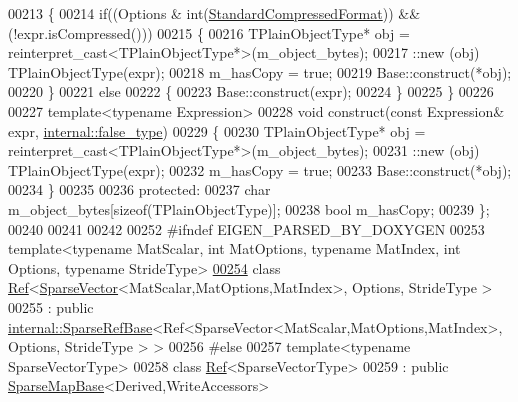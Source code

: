 \begin{DoxyCode}
00213     \{
00214       \textcolor{keywordflow}{if}((Options & \textcolor{keywordtype}{int}(\hyperlink{namespace_eigen_a668ffb0fb66c55c1c98bd35c52df648eaf81fc519ed9cc0ebc6aac69a366086a5}{StandardCompressedFormat})) && (!expr.isCompressed()))
00215       \{
00216         TPlainObjectType* obj = \textcolor{keyword}{reinterpret\_cast<}TPlainObjectType*\textcolor{keyword}{>}(m\_object\_bytes);
00217         ::new (obj) TPlainObjectType(expr);
00218         m\_hasCopy = \textcolor{keyword}{true};
00219         Base::construct(*obj);
00220       \}
00221       \textcolor{keywordflow}{else}
00222       \{
00223         Base::construct(expr);
00224       \}
00225     \}
00226 
00227     \textcolor{keyword}{template}<\textcolor{keyword}{typename} Expression>
00228     \textcolor{keywordtype}{void} construct(\textcolor{keyword}{const} Expression& expr, \hyperlink{struct_eigen_1_1internal_1_1false__type}{internal::false\_type})
00229     \{
00230       TPlainObjectType* obj = \textcolor{keyword}{reinterpret\_cast<}TPlainObjectType*\textcolor{keyword}{>}(m\_object\_bytes);
00231       ::new (obj) TPlainObjectType(expr);
00232       m\_hasCopy = \textcolor{keyword}{true};
00233       Base::construct(*obj);
00234     \}
00235 
00236   \textcolor{keyword}{protected}:
00237     \textcolor{keywordtype}{char} m\_object\_bytes[\textcolor{keyword}{sizeof}(TPlainObjectType)];
00238     \textcolor{keywordtype}{bool} m\_hasCopy;
00239 \};
00240 
00241 
00242 
00252 \textcolor{preprocessor}{#ifndef EIGEN\_PARSED\_BY\_DOXYGEN}
00253 \textcolor{keyword}{template}<\textcolor{keyword}{typename} MatScalar, \textcolor{keywordtype}{int} MatOptions, \textcolor{keyword}{typename} MatIndex, \textcolor{keywordtype}{int} Options, \textcolor{keyword}{typename} Str\textcolor{keywordtype}{id}eType>
\hyperlink{group___sparse_core___module}{00254} \textcolor{keyword}{class }\hyperlink{group___core___module_class_eigen_1_1_ref}{Ref}<\hyperlink{group___sparse_core___module_class_eigen_1_1_sparse_vector}{SparseVector}<MatScalar,MatOptions,MatIndex>, Options, StrideType >
00255   : \textcolor{keyword}{public} \hyperlink{class_eigen_1_1internal_1_1_sparse_ref_base}{internal::SparseRefBase}<Ref<SparseVector<MatScalar,MatOptions,MatIndex>, 
      Options, StrideType > >
00256 \textcolor{preprocessor}{#else}
00257 template<typename SparseVectorType>
00258 class \hyperlink{group___core___module_class_eigen_1_1_ref}{Ref}<SparseVectorType>
00259   : \textcolor{keyword}{public} \hyperlink{class_eigen_1_1_sparse_map_base}{SparseMapBase}<Derived,WriteAccessors>

\end{DoxyCode}
